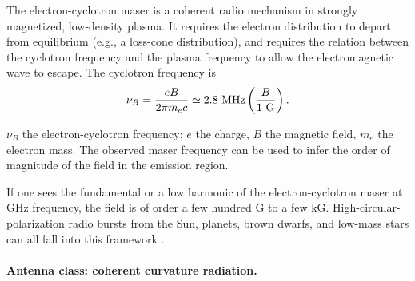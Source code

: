 The electron-cyclotron maser is a coherent radio mechanism in strongly magnetized, low-density plasma. It requires the electron distribution to depart from equilibrium (e.g., a loss-cone distribution), and requires the relation between the cyclotron frequency and the plasma frequency to allow the electromagnetic wave to escape. The cyclotron frequency is
\begin{equation}
  \nu_B=\frac{eB}{2\pi m_ec}
       \simeq2.8~{\rm MHz}\left(\frac{B}{1~{\rm G}}\right).
  \label{eq:e16-cyclotron-frequency}
\end{equation}
\begin{formulaexplain}
\(\nu_B\) the electron-cyclotron frequency; \(e\) the charge, \(B\) the magnetic field, \(m_e\) the electron mass. The observed maser frequency can be used to infer the order of magnitude of the field in the emission region.
\end{formulaexplain}
If one sees the fundamental or a low harmonic of the electron-cyclotron maser at GHz frequency, the field is of order a few hundred G to a few kG. High-circular-polarization radio bursts from the Sun, planets, brown dwarfs, and low-mass stars can all fall into this framework \citep{1982ApJ...259..844M,2006A&ARv..13..229T,2008ApJ...684..644H,1985ARA&A..23..169D}.

\paragraph{Antenna class: coherent curvature radiation.}
\label{sec:e16-curvature}

